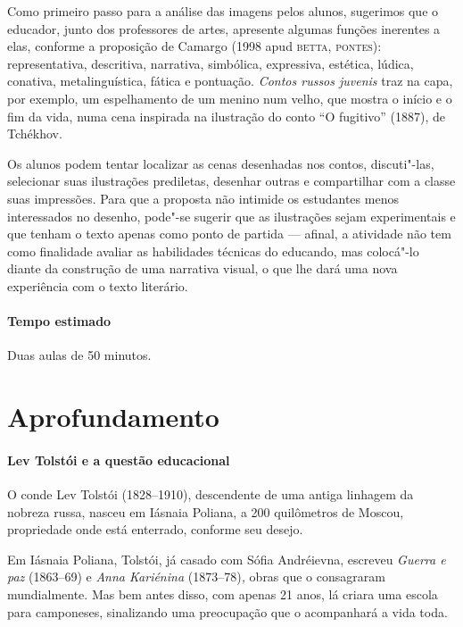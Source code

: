 \documentclass[11pt]{extarticle}
\begin{document}

Como primeiro passo para a análise das imagens pelos alunos, sugerimos
que o educador, junto dos professores de artes, apresente algumas funções inerentes a elas, conforme a
proposição de Camargo (1998 apud \textsc{betta}, \textsc{pontes}): representativa,
descritiva, narrativa, simbólica, expressiva, estética, lúdica,
conativa, metalinguística, fática e pontuação. \emph{Contos russos
juvenis} traz na capa, por exemplo, um espelhamento de um menino num
velho, que mostra o início e o fim da vida, numa cena inspirada na
ilustração do conto ``O fugitivo'' (1887), de Tchékhov.
	
Os alunos podem tentar localizar as cenas desenhadas nos contos,
discuti"-las, selecionar suas ilustrações prediletas, desenhar outras e
compartilhar com a classe suas impressões. Para que a proposta não
intimide os estudantes menos interessados no desenho, pode"-se sugerir
que as ilustrações sejam experimentais e que tenham o texto apenas como
ponto de partida --- afinal, a atividade não tem como finalidade avaliar
as habilidades técnicas do educando, mas colocá"-lo diante da construção
de uma narrativa visual, o que lhe dará uma nova experiência com o texto
literário.

\paragraph{Tempo estimado} Duas aulas de 50 minutos.

\section{Aprofundamento}


\paragraph{Lev Tolstói e a questão educacional}

O conde Lev Tolstói (1828--1910), descendente de uma antiga linhagem da
nobreza russa, nasceu em Iásnaia Poliana, a 200 quilômetros de Moscou,
propriedade onde está enterrado, conforme seu desejo.

Em Iásnaia Poliana, Tolstói, já casado com Sófia Andréievna, escreveu
\emph{Guerra e paz} (1863--69) e \emph{Anna Kariénina}
(1873--78)\emph{,} obras que o consagraram mundialmente. Mas bem antes
disso, com apenas 21 anos, lá criara uma escola para camponeses,
sinalizando uma preocupação que o acompanhará a vida toda.
\end{document}
